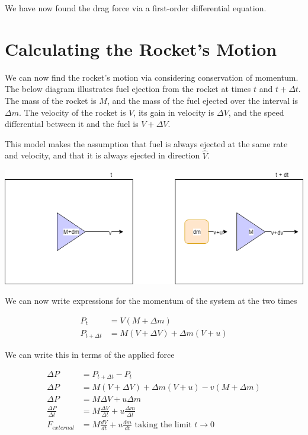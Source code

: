 \documentclass[]{article}
\begin{document}
We have now found the drag force via a first-order differential equation.

\newpage
\section{Calculating the Rocket's Motion}

We can now find the rocket's motion via considering conservation of momentum. The below diagram illustrates fuel ejection from the rocket at times $t$ and $t+\Delta t$. The mass of the rocket is $M$, and the mass of the fuel ejected over the interval is $\Delta m$. The velocity of the rocket is $V$, its gain in velocity is $\Delta V$, and the speed differential between it and the fuel is $V+\Delta V$.

This model makes the assumption that fuel is always ejected at the same rate and velocity, and that it is always ejected in direction $\hat{V}$.

\begin{center}
	\includegraphics[scale=0.6]{momentum.png}
\end{center}

We can now write expressions for the momentum of the system at the two times

\begin{center}
	\begin{align*}
	P_{t} &= V(M+\Delta m) \\
	P_{t+\Delta t} &= M(V + \Delta V) + \Delta m (V+u)
	\end{align*}
\end{center}

We can write this in terms of the applied force

\begin{center}
	\begin{align*}
	\Delta P &= P_{t+\Delta t} - P_{t} \\
	\Delta P &= M(V + \Delta V) + \Delta m (V+u) - v(M+\Delta m) \\
	\Delta P &= M\Delta V + u\Delta m \\
	\frac{\Delta P}{\Delta t} &= M\frac{\Delta V}{\Delta t} +  u\frac{\Delta m}{\Delta t} \\
	F_{external} &= M \frac{dV}{dt} + u \frac{dm}{dt} \text{  taking the limit $t\rightarrow 0$}
	\end{align*}
\end{center}
\end{document}
